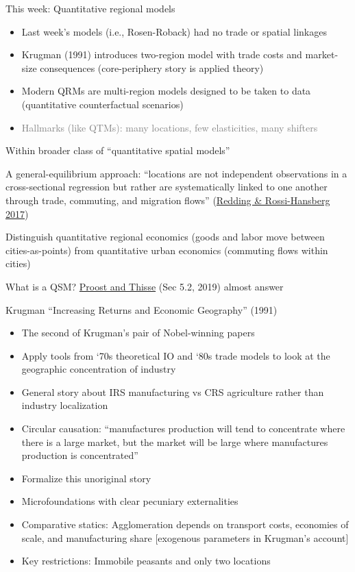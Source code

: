 \documentclass[11pt,notes=hide,aspectratio=169]{beamer}
\begin{document}
\begin{frame}{This week: Quantitative regional models}
\begin{itemize}
\item Last week's models (i.e., Rosen-Roback) had no trade or spatial linkages
\item Krugman (1991) introduces two-region model with trade costs and market-size consequences (core-periphery story is applied theory)
\item Modern QRMs are multi-region models designed to be taken to data (quantitative counterfactual scenarios)
\item[] \textcolor{gray}{Hallmarks (like QTMs): many locations, few elasticities, many shifters}
\end{itemize}
Within broader class of ``quantitative spatial models''
\begin{itemize}{\small
\item A general-equilibrium approach:
``locations are not independent observations in a cross-sectional regression but rather are systematically linked to one another through trade, commuting, and migration flows'' (\href{https://doi.org/10.1146/annurev-economics-063016-103713}{Redding \& Rossi-Hansberg 2017})
\item Distinguish quantitative regional economics (goods and labor move between cities-as-points)
from
quantitative urban economics (commuting flows within cities)
\item What is a QSM? \href{https://www.aeaweb.org/articles?id=10.1257/jel.20181414}{Proost and Thisse} (Sec 5.2, 2019) almost answer
\par}\end{itemize}
\end{frame}
\begin{frame}{Krugman ``Increasing Returns and Economic Geography'' (1991)}
\begin{itemize}
	\item The second of Krugman's pair of Nobel-winning papers
	\item Apply tools from `70s theoretical IO and `80s trade models to look at the geographic concentration of industry
	\item General story about IRS manufacturing vs CRS agriculture rather than industry localization
	\item Circular causation: ``manufactures production will tend to concentrate where there is a large market, but the market will be large where manufactures production is concentrated''
	\item Formalize this unoriginal story
	\item Microfoundations with clear pecuniary externalities
	\item Comparative statics: Agglomeration depends on transport costs, economies of scale, and manufacturing share [exogenous parameters in Krugman's account]
	\item Key restrictions: Immobile peasants and only two locations
\end{itemize}
\end{frame}
\end{document}
